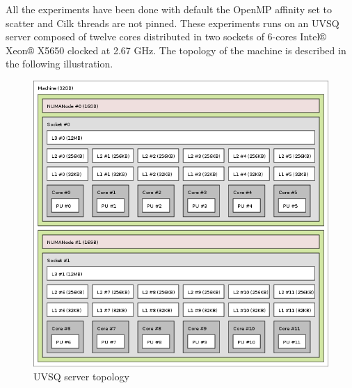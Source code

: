 \documentclass{IOS-Book-Article}
\begin{document}
All the experiments have been done with default the OpenMP affinity set to scatter and Cilk threads are not pinned. These experiments runs on an UVSQ server
composed of twelve cores distributed in two sockets of 6-cores Intel® Xeon® X5650 clocked at 2.67 GHz. The topology of the machine is described in the following illustration.
\begin{figure}[htp]
 \centering
 \label{fig5}
 \includegraphics[scale=0.35]{topo_mauduit.png}
 \caption{UVSQ server topology}
\end{figure}
\end{document}
